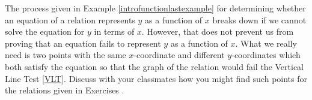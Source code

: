 {\noindent The process given in Example \ref{introfunctionlastexample} for determining whether an equation of a relation represents $y$ as a function of $x$ breaks down if we cannot solve the equation for $y$ in terms of $x$.  However, that does not prevent us from proving that an equation fails to represent $y$ as a function of $x$.  What we really need is two points with the same $x$-coordinate and different $y$-coordinates which both satisfy the equation so that the graph of the relation would fail the Vertical Line Test \ref{VLT}.  Discuss with your classmates how you might find such points for the relations given in Exercises}
{.}
